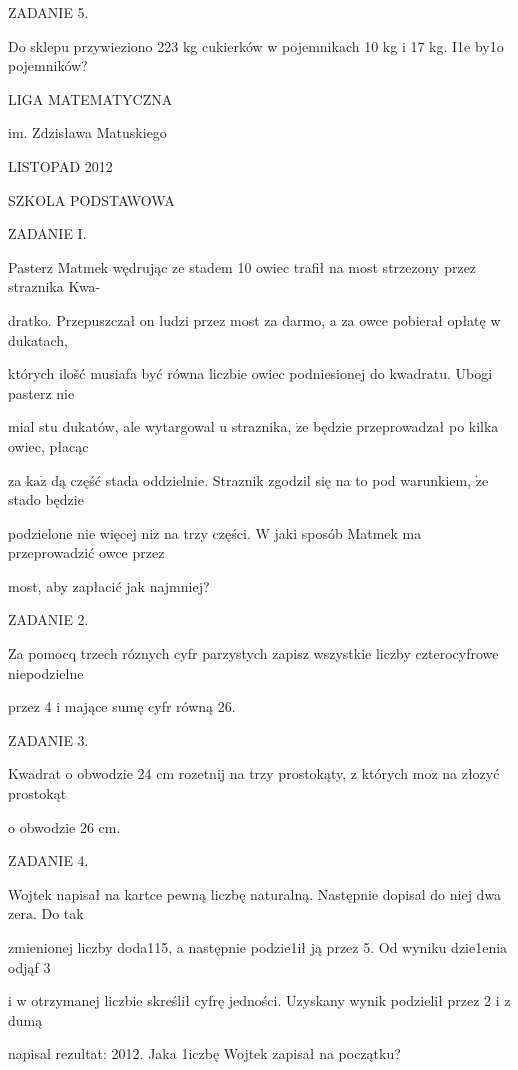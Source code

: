 \documentclass[a4paper,12pt]{article}
\begin{document}
ZADANIE 5.

Do sklepu przywieziono 223 kg cukierków w pojemnikach 10 kg i 17 kg. I1e by1o pojemników?






LIGA MATEMATYCZNA

im. Zdzisława Matuskiego

LISTOPAD 2012

SZKOLA PODSTAWOWA

ZADANIE I.

Pasterz Matmek wędrując ze stadem 10 owiec trafił na most strzezony przez straznika Kwa-

dratko. Przepuszczał on ludzi przez most za darmo, a za owce pobierał opłatę w dukatach,

których ilošć musiafa być równa liczbie owiec podniesionej do kwadratu. Ubogi pasterz nie

mial stu dukatów, ale wytargowal $\mathrm{u}$ straznika, $\dot{\mathrm{z}}\mathrm{e}$ będzie przeprowadzał po kilka owiec, płacąc

za $\mathrm{k}\mathrm{a}\dot{\mathrm{z}}$ dą część stada oddzielnie. Straznik zgodzil się na to pod warunkiem, $\dot{\mathrm{z}}\mathrm{e}$ stado będzie

podzielone nie więcej $\mathrm{n}\mathrm{i}\dot{\mathrm{z}}$ na trzy części. $\mathrm{W}$ jaki sposób Matmek ma przeprowadzić owce przez

most, aby zapłacić jak najmniej?

ZADANIE 2.

Za pomocq trzech róznych cyfr parzystych zapisz wszystkie liczby czterocyfrowe niepodzielne

przez 4 i mające sumę cyfr równą 26.

ZADANIE 3.

Kwadrat o obwodzie 24 cm rozetnij na trzy prostokąty, z których $\mathrm{m}\mathrm{o}\dot{\mathrm{z}}$ na złozyć prostokąt

o obwodzie 26 cm.

ZADANIE 4.

Wojtek napisał na kartce pewną liczbę naturalną. Następnie dopisal do niej dwa zera. Do tak

zmienionej liczby doda115, a następnie podzie1ił ją przez 5. Od wyniku dzie1enia odjąf 3

i w otrzymanej liczbie skreślił cyfrę jedności. Uzyskany wynik podzielił przez 2 i z dumą

napisal rezultat: 2012. Jaka 1iczbę Wojtek zapisał na początku?
\end{document}
